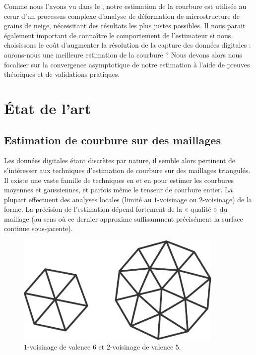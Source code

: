 Comme nous l'avons vu dans le , notre estimation
de la courbure est utilisée au cœur d'un processus complexe d'analyse de
déformation de microstructure de grains de neige, nécessitant des résultats les
plus justes possibles. Il nous parait également important de connaître le
comportement de l'estimateur si nous choisissons le coût d'augmenter la résolution
de la capture des données digitales : aurons-nous une meilleure estimation de la
courbure ? Nous devons alors nous focaliser sur la convergence asymptotique de
notre estimation à l'aide de preuves théoriques et de validations pratiques.
%
\section{État de l'art}%
\label{sec:estimators:SOTA}
%
\subsection{Estimation de courbure sur des maillages}
%
Les données digitales étant discrètes par nature, il semble alors pertinent de
s'intéresser aux techniques d'estimation de courbure sur des maillages
triangulés. Il existe une vaste famille de techniques en \ComputerGraphics et en
\GeometryProcessing pour estimer les courbures moyennes et gaussiennes, et
parfois même le tenseur de courbure entier. La plupart effectuent des analyses
locales (\cad limité au $1$-voisinage ou $2$-voisinage) de la forme. La
précision de l'estimation dépend fortement de la « qualité » du maillage (au
sens où ce dernier approxime suffisamment précisément la surface continue sous-jacente).

\begin{figure}[ht]
    \begin{center}
      \includegraphics[width=10cm]{figures/OneRingNeighborhood}
    \end{center}
    \caption[$1$-voisinage et $2$-voisinage.]{$1$-voisinage de valence $6$ et
    $2$-voisinage de valence $5$.}
    \label{fig:one-ring-neighborhood}
\end{figure}

